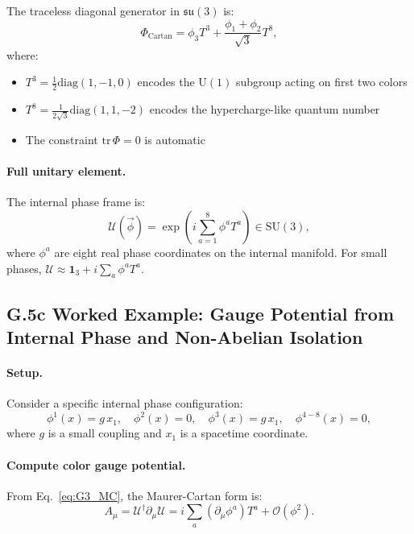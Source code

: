 The traceless diagonal generator in $\mathfrak{su}(3)$ is:
\begin{equation}
\Phi_{\text{Cartan}} = \phi_3 T^3 + \frac{\phi_1 + \phi_2}{\sqrt{3}} T^8,
\label{eq:cartan-map}
\end{equation}
where:
\begin{itemize}
\item $T^3 = \tfrac{1}{2}\mathrm{diag}(1, -1, 0)$ encodes the $\mathrm{U}(1)$ subgroup acting on first two colors
\item $T^8 = \tfrac{1}{2\sqrt{3}}\mathrm{diag}(1, 1, -2)$ encodes the hypercharge-like quantum number
\item The constraint $\mathrm{tr}\,\Phi = 0$ is automatic
\end{itemize}

\paragraph{Full unitary element.} The internal phase frame is:
\begin{equation}
\mathcal{U}(\vec{\phi}) = \exp\left(i\sum_{a=1}^8 \phi^a T^a\right) \in \mathrm{SU}(3),
\label{eq:U-phase-full}
\end{equation}
where $\phi^a$ are eight real phase coordinates on the internal manifold. For small phases, $\mathcal{U} \approx \mathbf{1}_3 + i\sum_a \phi^a T^a$.

\subsection*{G.5c Worked Example: Gauge Potential from Internal Phase and Non-Abelian Isolation}
\label{sec:G5c_worked_example}

\paragraph{Setup.} Consider a specific internal phase configuration:
\begin{equation}
\phi^1(x) = g \, x_1, \quad \phi^2(x) = 0, \quad \phi^3(x) = g \, x_1, \quad \phi^{4-8}(x) = 0,
\label{eq:example-phase}
\end{equation}
where $g$ is a small coupling and $x_1$ is a spacetime coordinate.

\paragraph{Compute color gauge potential.} From Eq.~\eqref{eq:G3_MC}, the Maurer-Cartan form is:
\begin{equation}
A_\mu = \mathcal{U}^\dagger \partial_\mu \mathcal{U} = i\sum_a (\partial_\mu \phi^a) T^a + \mathcal{O}(\phi^2).
\label{eq:A-example-1}
\end{equation}

